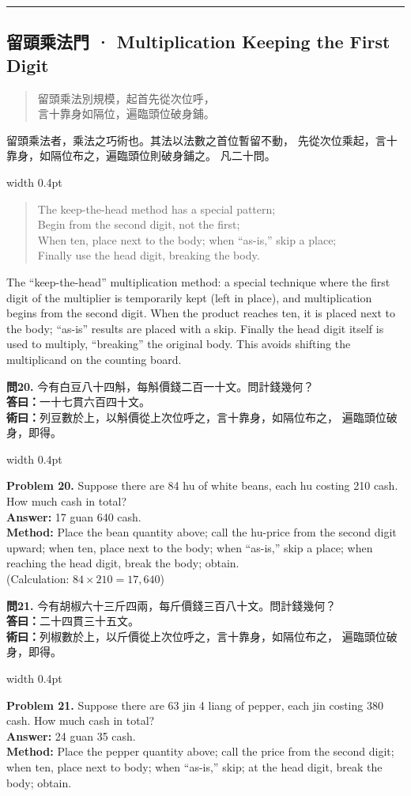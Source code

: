 \documentclass[10pt,a4paper]{article}
\newcommand{\longline}{\noindent\rule{\textwidth}{0.3pt}}
\newlength{\cnwidth}
\newlength{\enwidth}
\newcommand{\bilingual}[2]{%
  \noindent%
  \begin{minipage}[t]{\cnwidth}%
    #1%
  \end{minipage}%
  \hfill\vrule width 0.4pt\hfill%
  \begin{minipage}[t]{\enwidth}%
    #2%
  \end{minipage}%
  \par\smallskip%
}
\newcommand{\bilingualsubsection}[2]{%
  \subsection*{#1 · #2}
}
\newenvironment{rhymecn}{%
  \begin{quote}\itshape\color{verselinecolor}
}{\end{quote}}
\begin{document}
\longline


\bilingualsubsection{留頭乘法門}{Multiplication Keeping the First Digit}
\label{sec:liutou}

\bilingual{%
  \begin{rhymecn}
  留頭乘法別規模，起首先從次位呼，\\
  言十靠身如隔位，遍臨頭位破身鋪。
  \end{rhymecn}
  留頭乘法者，乘法之巧術也。其法以法數之首位暫留不動，
  先從次位乘起，言十靠身，如隔位布之，遍臨頭位則破身鋪之。
  凡二十問。
}{%
  \begin{rhymecn}
  The keep-the-head method has a special pattern;\\
  Begin from the second digit, not the first;\\
  When ten, place next to the body; when ``as-is,'' skip a place;\\
  Finally use the head digit, breaking the body.
  \end{rhymecn}
  The ``keep-the-head'' multiplication method: a special technique where
  the first digit of the multiplier is temporarily kept (left in place), and
  multiplication begins from the second digit. When the product reaches ten,
  it is placed next to the body; ``as-is'' results are placed with a skip.
  Finally the head digit itself is used to multiply, ``breaking'' the original
  body. This avoids shifting the multiplicand on the counting board.
}

\bilingual{%
  \textbf{問20.}
  今有白豆八十四斛，每斛價錢二百一十文。問計錢幾何？\\
  \textbf{答曰：}一十七貫六百四十文。\\
  \textbf{術曰：}列豆數於上，以斛價從上次位呼之，言十靠身，如隔位布之，
  遍臨頭位破身，即得。
}{%
  \textbf{Problem 20.}
  Suppose there are 84 hu of white beans, each hu costing 210 cash.
  How much cash in total?\\
  \textbf{Answer:} 17 guan 640 cash.\\
  \textbf{Method:} Place the bean quantity above; call the hu-price from the
  second digit upward; when ten, place next to the body; when ``as-is,'' skip a place;
  when reaching the head digit, break the body; obtain.\\
  (Calculation: $84 \times 210 = 17{,}640$)
}

\bilingual{%
  \textbf{問21.}
  今有胡椒六十三斤四兩，每斤價錢三百八十文。問計錢幾何？\\
  \textbf{答曰：}二十四貫三十五文。\\
  \textbf{術曰：}列椒數於上，以斤價從上次位呼之，言十靠身，如隔位布之，
  遍臨頭位破身，即得。
}{%
  \textbf{Problem 21.}
  Suppose there are 63 jin 4 liang of pepper, each jin costing 380 cash.
  How much cash in total?\\
  \textbf{Answer:} 24 guan 35 cash.\\
  \textbf{Method:} Place the pepper quantity above; call the price from the
  second digit; when ten, place next to body; when ``as-is,'' skip; at the head
  digit, break the body; obtain.
}
\end{document}
